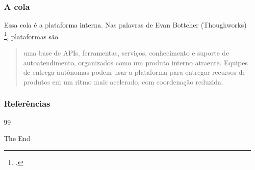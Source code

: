 \documentclass[
	11pt,
	aspectratio=169,
]{beamer}
\begin{document}
\begin{frame}
  \frametitle{A cola}

  Essa cola é a plataforma interna. Nas palavras de Evan Bottcher (Thoughworks) \footcite{evan}, plataformas são \begin{quote}
    uma base de APIs, ferramentas, serviços, conhecimento e suporte de autoatendimento, organizados como um produto interno atraente.
    Equipes de entrega autônomas podem usar a plataforma para entregar recursos de produtos em um ritmo mais acelerado,
    com coordenação reduzida.
  \end{quote}
  
\end{frame}

\begin{frame}[allowframebreaks]
	\frametitle{Referências}
	
	\begin{thebibliography}{99}
		\footnotesize
		
    	\printbibliography
    
	\end{thebibliography}
\end{frame}

\begin{frame}[plain]
	{\Huge The End}
\end{frame}
\end{document}
